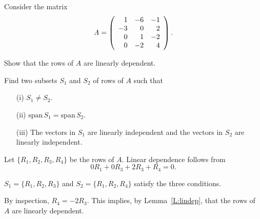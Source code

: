 \documentclass{ximera}
\author{Matthew Carr \& Marty Golubitsky}
\begin{document}
\begin{exercise}\label{mc.exerciseErr6_M}
Consider the matrix
 \[
A=\left(\begin{array}{rrrrrrrrrrrrrrrrrr} 1 & -6 & -1 \\ -3 & 0 & 2 \\ 0 & 1 & -2 \\ 0 & -2 & 4 \end{array}\right)\ldotp
\]
\begin{enumeratea} 
\item Show that the rows of $A$ are  linearly dependent.
\item Find two subsets $S_1$ and $S_2$ of rows of $A$ such that 
\begin{enumerate}
	\item[(i)] $S_1\ne S_2$.
	\item[(ii)] $\mathrm{span}\,S_1=\mathrm{span}\,S_2$. 
	\item[(iii)] The vectors in $S_1$ are linearly independent and the vectors in $S_2$ are linearly independent. 
	\end{enumerate}
\end{enumeratea}

\begin{solution}
\ans 
\begin{enumeratea}
\item Let $\{R_1,R_2,R_3,R_4\}$ be the rows of $A$.  Linear dependence follows from 
\[
0R_1 + 0R_3+2R_3+R_4 = 0.
\] 
\item $S_1=\{R_1,R_2,R_3\}$ and $S_2=\{R_1,R_2,R_4\}$ satisfy the three conditions.
\end{enumeratea}

\soln 

\begin{enumeratea}

\item By inspection, $R_4=-2R_3$. This implies, by Lemma~\ref{L:lindep}, that the rows of $A$ are linearly dependent. 


\end{enumeratea}
\end{solution}
\end{exercise}
\end{document}
